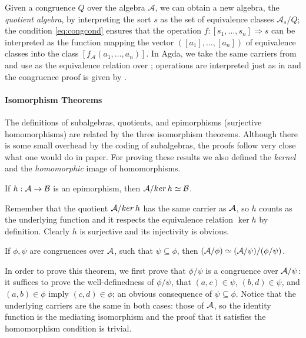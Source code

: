 Given a congruence $Q$ over the algebra $\mathcal{A}$, we can obtain a
new algebra, the \emph{quotient algebra}, by interpreting the sort $s$
as the set of equivalence classes $\mathcal{A}_s / Q$; the condition
\eqref{eq:congcond} ensures that the operation $ f : [s_1, \ldots,s_n]
\Rightarrow s$ can be interpreted as the function mapping the vector
$([a_1],\ldots,[a_n])$ of equivalence classes into the class $[
f_\mathcal{A}(a_1,\ldots,a_n)]$. In Agda, we take the same carriers
from  and use \AgdaSpace{} as the equivalence relation over
\AgdaSpace{}\AgdaSpace{}\AgdaSpace{}; operations are interpreted just as in  and the congruence proof
is given by \AgdaSpace{}.

\paragraph*{Isomorphism Theorems} The definitions of subalgebras,
quotients, and epimorphisms (surjective homomorphisms) are related by
the three isomorphism theorems. Although there is some small overhead
by the coding of subalgebras, the proofs follow very close what one would
do in paper. For proving these results we also defined the
\emph{kernel} and the \emph{homomorphic} image of homomorphisms.

\begin{theorem} If $h : \mathcal{A} \rightarrow \mathcal{B}$
is an epimorphism, then $\mathcal{A} /\! \mathop{ker} h \simeq \mathcal{B}$.
\end{theorem}
\noindent Remember that the quotient $\mathcal{A} /\! \mathop{ker} h$ has
the same carrier as $\mathcal{A}$, so $h$ counts as the underlying function
and it respects the equivalence relation $\mathop{ker} h$ by
definition. Clearly $h$ is surjective and its injectivity is obvious.

\begin{theorem} If $\phi,\psi$ are congruences over $\mathcal{A}$,
such that $\psi \subseteq \phi$, then $(\mathcal{A} / \phi) \simeq (\mathcal{A} / \psi)/(\phi / \psi)$. 
\end{theorem}

\noindent In order to prove this theorem, we first prove that
$\phi / \psi$ is a congruence over $\mathcal{A} / \psi$: it suffices to
prove the well-definedness of $\phi / \psi$, \ie that
$(a,c) \in \psi$, $(b,d) \in \psi$, and $(a,b) \in \phi$ imply
$(c,d) \in \phi$; an obvious consequence of $\psi \subseteq
\phi$. Notice that the underlying carriers are the same in both cases:
those of $\mathcal{A}$, so the identity function is the mediating
isomorphism and the proof that it satisfies the homomorphism condition
is trivial.

